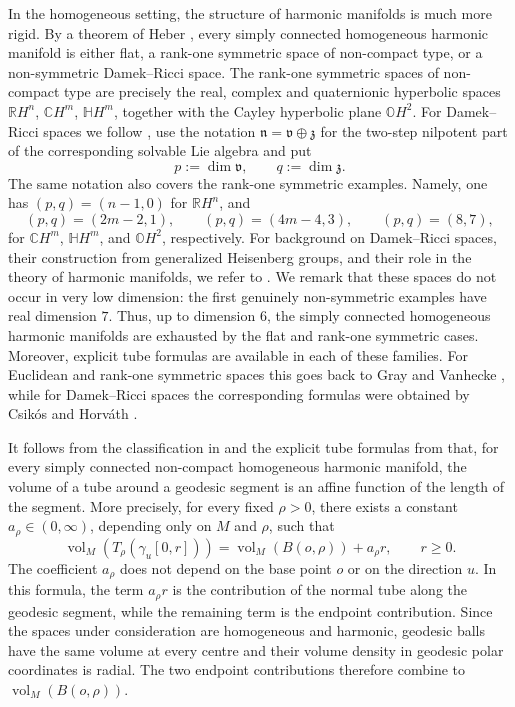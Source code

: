 \documentclass[11pt,a4paper]{article}
\theoremstyle{plain}
\theoremstyle{definition}
\theoremstyle{remark}
\newcommand{\vol}{\mathop{\mathrm{vol}}\nolimits}
\def\CC{\mathbb{C}}
\def\RR{\mathbb{R}}
\begin{document}
In the homogeneous setting, the structure of harmonic manifolds is much more
rigid. By a theorem of Heber \cite[Corollary 1.2]{HeberHarmonicHomogeneous}, every simply
connected homogeneous harmonic manifold is either flat, a rank-one symmetric
space of non-compact type, or a non-symmetric Damek--Ricci space. {The
rank-one symmetric spaces of non-compact type are precisely the real, complex
and quaternionic hyperbolic spaces \(\RR H^n\), \(\CC H^m\), \(\mathbb H H^m\), together with the Cayley hyperbolic plane \(\mathbb O H^2\).  For Damek--Ricci spaces we follow \cite[Chapter 3]{DRSpaces}, use the notation
\(\mathfrak n=\mathfrak v\oplus\mathfrak z\) for the two-step nilpotent part
of the corresponding solvable Lie algebra and put
\[
p:=\dim\mathfrak v,
\qquad
q:=\dim\mathfrak z.
\]
The same notation also covers the rank-one symmetric
examples. Namely, one has $(p,q)=(n-1,0)$ for \(\RR H^n\),
and
\[
(p,q)=(2m-2,1),\qquad (p,q)=(4m-4,3),\qquad (p,q)=(8,7),
\]
for \(\CC H^m\), \(\mathbb H H^m\), and \(\mathbb O H^2\), respectively.} For background on Damek--Ricci spaces, their construction from generalized Heisenberg groups,
and their role in the theory of harmonic manifolds, we refer to \cite{DRSpaces}. We remark that these spaces do not occur in very low dimension: the first genuinely non-symmetric examples have real dimension \(7\).
Thus, up to dimension \(6\), the simply connected homogeneous harmonic manifolds are exhausted by the flat and rank-one symmetric cases. Moreover, explicit tube formulas are available in each of these families. For
Euclidean and rank-one symmetric spaces this goes back to Gray and Vanhecke
\cite{GrayVanheckeTubes}, while for Damek--Ricci spaces the corresponding
formulas were obtained by Csikós and Horváth \cite[Theorem 4.1]{CsikosHorvathTubes}.

It follows from the classification in \cite{HeberHarmonicHomogeneous} and the
explicit tube formulas from \cite{CsikosHorvathTubes,GrayVanheckeTubes} that,
for every simply connected non-compact homogeneous harmonic manifold, the
volume of a tube around a geodesic segment is an affine function of the length
of the segment. More precisely, for every fixed \(\rho>0\), there exists a
constant \(a_\rho\in(0,\infty)\), depending only on \(M\) and \(\rho\), such
that
\begin{equation}\label{eq:arho}
	\vol_M(T_\rho(\gamma_u[0,r]))
	=
	\vol_M(B(o,\rho))+a_\rho r,
	\qquad r\geq 0.
\end{equation}
The coefficient \(a_\rho\) does not depend on the base point
\(o\) or on the direction \(u\). In this formula, the term \(a_\rho r\) is the contribution of the normal tube along the geodesic segment, while the remaining term is the endpoint contribution. Since the spaces under consideration are homogeneous
and harmonic, geodesic balls have the same volume at every centre and their volume density in geodesic polar coordinates is radial. The two endpoint contributions therefore combine to \(\vol_M(B(o,\rho))\).
\end{document}
